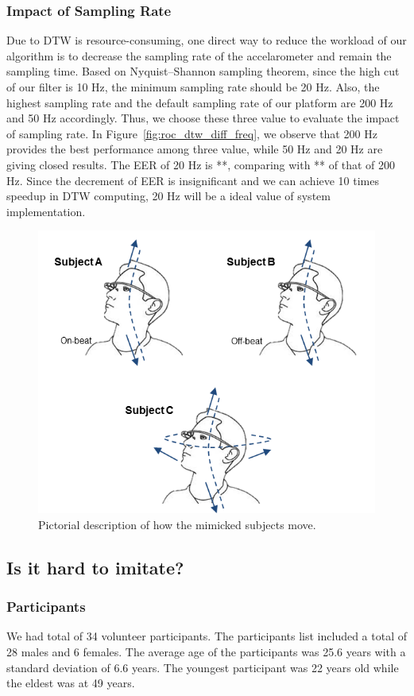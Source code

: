 \subsubsection{Impact of Sampling Rate}
Due to DTW is resource-consuming, one direct way to reduce the workload of our algorithm is to decrease the sampling rate of the accelarometer and remain the sampling time. Based on Nyquist–Shannon sampling theorem, since the high cut of our filter is 10 Hz, the minimum sampling rate should be 20 Hz. Also, the highest sampling rate and the default sampling rate of our platform are 200 Hz and 50 Hz accordingly. Thus, we choose these three value to evaluate the impact of sampling rate.  In Figure~\ref{fig:roc_dtw_diff_freq}, we observe that 200 Hz provides the best performance among three value, while 50 Hz and 20 Hz are giving closed results. The EER of 20 Hz is **, comparing with  ** of that of 200 Hz. Since the decrement of EER is insignificant and we can achieve 10 times speedup in DTW computing,  20 Hz will be a ideal value of system implementation. 
\begin{figure}
\centering
\includegraphics[width = \columnwidth]{figure/imitation_subject_movement.png}
\caption{\label{fig:imitation_movement} Pictorial description of how the mimicked subjects move.}
\end{figure}
\subsection{Is it hard to imitate?}
\subsubsection{Participants}
We had total of 34 volunteer participants. The participants list included a total of 28 males and 6 females. 
The average age of the participants was 25.6 years with a standard deviation 
of 6.6 years. The youngest participant was 22 years old while the eldest was 
at 49 years.
